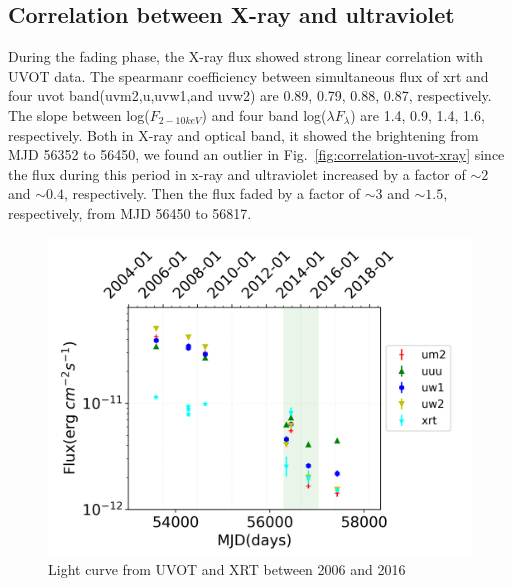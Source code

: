 \documentclass{aastex63}
\begin{document}
\subsection{Correlation between X-ray and ultraviolet}\label{subsec:xray-uvot}
During the fading phase, the X-ray flux showed strong linear correlation with UVOT data. The spearmanr coefficiency between simultaneous flux of xrt and four uvot band(uvm2,u,uvw1,and uvw2) are 0.89, 0.79, 0.88, 0.87, respectively. The slope  between log($F_{2-10keV}$) and four band log($\lambda F_{\lambda}$) are 1.4, 0.9, 1.4, 1.6, respectively. Both in X-ray and optical band, it showed the brightening from MJD 56352 to 56450, we found an outlier in Fig.~\ref{fig:correlation-uvot-xray} since the flux during this period in x-ray and ultraviolet increased by a factor of $\sim 2$ and $\sim 0.4$, respectively. Then the flux faded by a factor of $\sim 3$ and $\sim 1.5$, respectively, from MJD 56450 to 56817.



\begin{figure}
\centering
	\includegraphics[width=0.7\columnwidth]{./pic/uvot-xray-date-lc-sim-left.png}
    \caption{Light curve from UVOT and XRT  between 2006 and 2016}
    \label{fig:uvot-xray-date-lc-all}
\end{figure}
\end{document}
